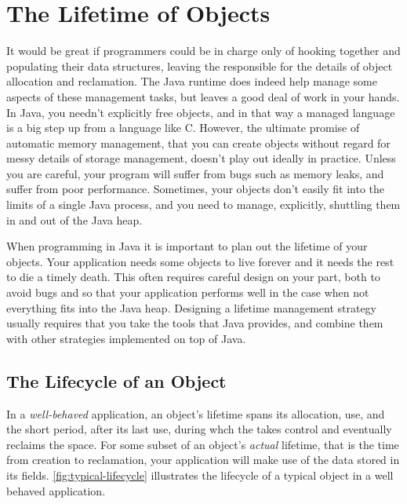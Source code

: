 \chapter{The Lifetime of Objects}

It would be great if programmers could be in charge only of hooking together and
populating their data structures, leaving the \jre responsible for the details
of object allocation and reclamation. The Java runtime does indeed help manage some
aspects of these management tasks, but leaves a good deal of work in your hands.
In Java, you needn't explicitly free objects, and in that way a managed language
is a big step up from a language like C. However, the ultimate promise of
automatic memory management, that you can create objects without regard for messy
details of storage management, doesn't play out ideally in practice. Unless you
are careful, your program will suffer from bugs such as memory leaks, and suffer
from poor performance. Sometimes, your objects don't easily fit into the limits
of a single Java process, and you need to manage, explicitly, shuttling them in
and out of the Java heap.

When programming in Java it is important to plan out the lifetime of your
objects. Your application needs some objects to live forever and it needs the
rest to die a timely death. This often requires careful design on your part, both
to avoid bugs and so that your application performs well in the case when not
everything fits into the Java heap. Designing a lifetime management strategy
usually requires that you take the tools that Java provides, and combine them
with other strategies implemented on top of Java.

\section{The Lifecycle of an Object}

In a \emph{well-behaved} application, an object's lifetime spans its allocation,
use, and the short period, after its last use, during whch the \jre takes
control and eventually reclaims the space. For some subset of an object's {\em actual}
lifetime, that is the time from creation to reclamation, your application will
make use of the data stored in its fields.
\autoref{fig:typical-lifecycle} illustrates the lifecycle of a typical
object in a well behaved application.

